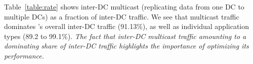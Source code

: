 Table~\ref{table:rate} shows inter-DC multicast
(replicating data from one DC to multiple DCs) as
a fraction of inter-DC traffic.
We see that multicast traffic dominates \company's
overall inter-DC traffic (91.13\%), as well as
individual application types (89.2 to 99.1\%).
{\em The fact that inter-DC multicast traffic
amounting to a dominating share of inter-DC traffic
highlights the importance of optimizing its
performance.}


